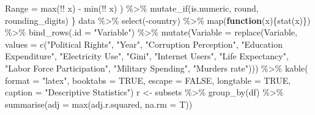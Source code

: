 \documentclass[
  english,
  man,floatsintext]{apa6}
\newenvironment{Shaded}{\begin{snugshade}}{\end{snugshade}}
\newcommand{\AttributeTok}[1]{\textcolor[rgb]{0.77,0.63,0.00}{#1}}
\newcommand{\ConstantTok}[1]{\textcolor[rgb]{0.00,0.00,0.00}{#1}}
\newcommand{\ControlFlowTok}[1]{\textcolor[rgb]{0.13,0.29,0.53}{\textbf{#1}}}
\newcommand{\FunctionTok}[1]{\textcolor[rgb]{0.00,0.00,0.00}{#1}}
\newcommand{\NormalTok}[1]{#1}
\newcommand{\OtherTok}[1]{\textcolor[rgb]{0.56,0.35,0.01}{#1}}
\newcommand{\SpecialCharTok}[1]{\textcolor[rgb]{0.00,0.00,0.00}{#1}}
\newcommand{\StringTok}[1]{\textcolor[rgb]{0.31,0.60,0.02}{#1}}
\begin{document}
\begin{Shaded}
\begin{Highlighting}[]
                       \AttributeTok{Range =} \FunctionTok{max}\NormalTok{(}\SpecialCharTok{!!}\NormalTok{ x) }\SpecialCharTok{{-}} \FunctionTok{min}\NormalTok{(}\SpecialCharTok{!!}\NormalTok{ x) ) }\SpecialCharTok{\%\textgreater{}\%}
      \FunctionTok{mutate\_if}\NormalTok{(is.numeric, round, rounding\_digits)}
\NormalTok{\}}
\NormalTok{data }\SpecialCharTok{\%\textgreater{}\%} 
  \FunctionTok{select}\NormalTok{(}\SpecialCharTok{{-}}\NormalTok{country) }\SpecialCharTok{\%\textgreater{}\%} 
\FunctionTok{map}\NormalTok{(}\ControlFlowTok{function}\NormalTok{(x)\{}\FunctionTok{stat}\NormalTok{(x)\}) }\SpecialCharTok{\%\textgreater{}\%} 
  \FunctionTok{bind\_rows}\NormalTok{(}\AttributeTok{.id =} \StringTok{"Variable"}\NormalTok{) }\SpecialCharTok{\%\textgreater{}\%} 
  \FunctionTok{mutate}\NormalTok{(}\AttributeTok{Variable =} \FunctionTok{replace}\NormalTok{(Variable, }
                            \AttributeTok{values =} \FunctionTok{c}\NormalTok{(}\StringTok{"Political Rights"}\NormalTok{, }\StringTok{"Year"}\NormalTok{, }
                                       \StringTok{"Corruption Perception"}\NormalTok{, }
                                       \StringTok{"Education Expenditure"}\NormalTok{, }
                                       \StringTok{"Electricity Use"}\NormalTok{, }
                                       \StringTok{"Gini"}\NormalTok{, }
                                       \StringTok{"Internet Users"}\NormalTok{,}
                                       \StringTok{"Life Expectancy"}\NormalTok{, }
                                       \StringTok{"Labor Force Participation"}\NormalTok{, }
                                       \StringTok{"Military Spending"}\NormalTok{, }
                                       \StringTok{"Murders rate"}\NormalTok{))) }\SpecialCharTok{\%\textgreater{}\%} 
\FunctionTok{kable}\NormalTok{(}
  \AttributeTok{format =} \StringTok{"latex"}\NormalTok{,}
  \AttributeTok{booktabs =} \ConstantTok{TRUE}\NormalTok{,}
  \AttributeTok{escape =} \ConstantTok{FALSE}\NormalTok{,}
  \AttributeTok{longtable =} \ConstantTok{TRUE}\NormalTok{,}
 \AttributeTok{caption =} \StringTok{"Descriptive Statistics"}\NormalTok{)}
\NormalTok{r }\OtherTok{\textless{}{-}}\NormalTok{ subsets }\SpecialCharTok{\%\textgreater{}\%} 
  \FunctionTok{group\_by}\NormalTok{(df) }\SpecialCharTok{\%\textgreater{}\%} 
  \FunctionTok{summarise}\NormalTok{(}\AttributeTok{adj =} \FunctionTok{max}\NormalTok{(adj.r.squared, }\AttributeTok{na.rm =}\NormalTok{ T))}


\end{Highlighting}
\end{Shaded}
\end{document}
